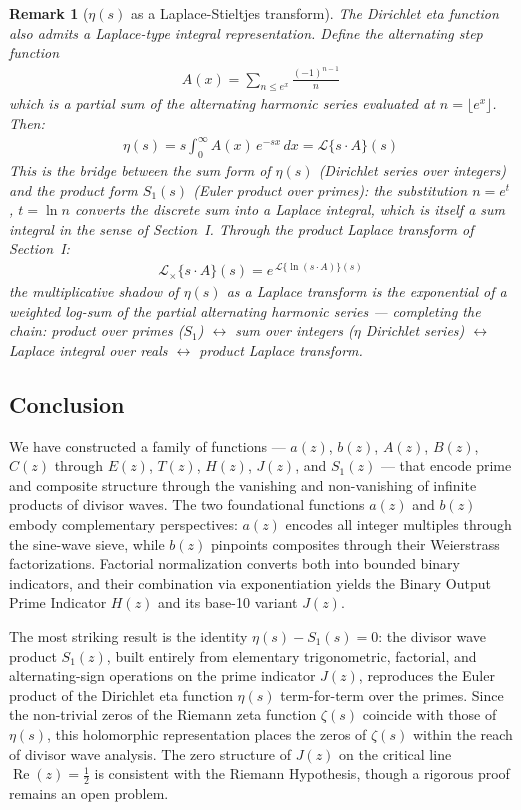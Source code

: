 \documentclass{article}
\newtheorem*{remark}{Remark}
\begin{document}
\begin{remark}[$\eta(s)$ as a Laplace-Stieltjes transform]
The Dirichlet eta function also admits a Laplace-type integral representation. Define the alternating step function
\begin{align*}
A(x) = \sum_{n \leq e^x} \frac{(-1)^{n-1}}{n}
\end{align*}
which is a partial sum of the alternating harmonic series evaluated at $n = \lfloor e^x \rfloor$. Then:
\begin{align*}
\eta(s) = s\int_0^{\infty} A(x)\,e^{-sx}\,dx = \mathcal{L}\{s\cdot A\}(s)
\end{align*}
This is the bridge between the sum form of $\eta(s)$ (Dirichlet series over integers) and the product form $S_1(s)$ (Euler product over primes): the substitution $n = e^t$, $t = \ln n$ converts the discrete sum into a Laplace integral, which is itself a sum integral in the sense of Section~I. Through the product Laplace transform of Section~I:
\begin{align*}
\mathcal{L}_\times\{s \cdot A\}(s) = e^{\,\mathcal{L}\{\ln(s\cdot A)\}(s)}
\end{align*}
the multiplicative shadow of $\eta(s)$ as a Laplace transform is the exponential of a weighted log-sum of the partial alternating harmonic series — completing the chain: product over primes ($S_1$) $\leftrightarrow$ sum over integers ($\eta$ Dirichlet series) $\leftrightarrow$ Laplace integral over reals $\leftrightarrow$ product Laplace transform.
\end{remark}

\newpage
\subsection{Conclusion}
We have constructed a family of functions — $a(z)$, $b(z)$, $A(z)$, $B(z)$, $C(z)$ through $E(z)$, $T(z)$, $H(z)$, $J(z)$, and $S_1(z)$ — that encode prime and composite structure through the vanishing and non-vanishing of infinite products of divisor waves. The two foundational functions $a(z)$ and $b(z)$ embody complementary perspectives: $a(z)$ encodes all integer multiples through the sine-wave sieve, while $b(z)$ pinpoints composites through their Weierstrass factorizations. Factorial normalization converts both into bounded binary indicators, and their combination via exponentiation yields the Binary Output Prime Indicator $H(z)$ and its base-10 variant $J(z)$.

The most striking result is the identity $\eta(s) - S_1(s) = 0$: the divisor wave product $S_1(z)$, built entirely from elementary trigonometric, factorial, and alternating-sign operations on the prime indicator $J(z)$, reproduces the Euler product of the Dirichlet eta function $\eta(s)$ term-for-term over the primes. Since the non-trivial zeros of the Riemann zeta function $\zeta(s)$ coincide with those of $\eta(s)$, this holomorphic representation places the zeros of $\zeta(s)$ within the reach of divisor wave analysis. The zero structure of $J(z)$ on the critical line $\operatorname{Re}(z) = \tfrac{1}{2}$ is consistent with the Riemann Hypothesis, though a rigorous proof remains an open problem.
\end{document}
